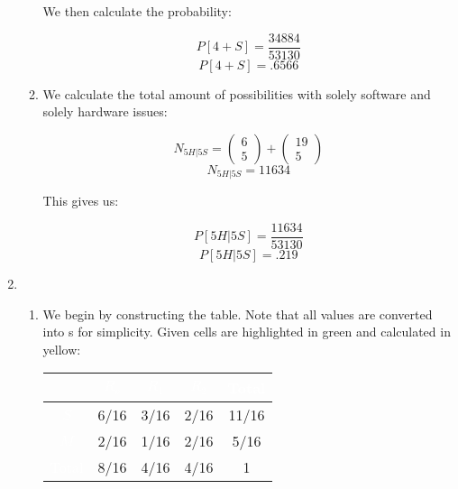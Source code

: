 \begin{enumerate}
\begin{enumerate}
        We then calculate the probability:

        $$P[4+S]=\frac{34884}{53130}$$
        $$\boxed{P[4+S]=.6566}$$

      \item We calculate the total amount of possibilities with solely software and solely hardware issues:

        $$N_{5H|5S}=\left( \begin{matrix} 6\\ 5\end{matrix} \right)+\left( \begin{matrix} 19\\ 5\end{matrix} \right)$$
        $$N_{5H|5S}=11634$$

        This gives us:
        
        $$P[5H|5S]=\frac{11634}{53130}$$
        $$\boxed{P[5H|5S]=.219}$$

    \end{enumerate}

  \item

    \begin{enumerate}

      \item We begin by constructing the table. Note that all values are converted into s for simplicity. Given cells are highlighted in green and calculated in yellow:

    \begin{center}
      \begin{tabular}[H]{|c|c|c|c|c|}
        \hline
        \rowcolor{black!60} \cellcolor{white} & \textcolor{white}{$R_o$} & \textcolor{white}{$R_1$} & \textcolor{white}{$R_2$} & \textcolor{white}{Total}\\
        \hline
        \cellcolor{black!60} \textcolor{white}{$S$} & \cellcolor{green!50} 6/16 & \cellcolor{yellow!40} 3/16 & \cellcolor{yellow!40} 2/16 & \cellcolor{green!50} 11/16\\
        \hline
        \cellcolor{black!60} \textcolor{white}{$M$} & \cellcolor{yellow!40} 2/16 & \cellcolor{yellow!40} 1/16 & \cellcolor{green!50} 2/16 & \cellcolor{yellow!40} 5/16\\
        \hline
        \cellcolor{black!60} \textcolor{white}{Total} & \cellcolor{green!50} 8/16 & \cellcolor{green!50} 4/16 & \cellcolor{green!50} 4/16 & \cellcolor{green!50} 1\\
        \hline
      \end{tabular}
    \end{center}


\end{enumerate}
\end{enumerate}
